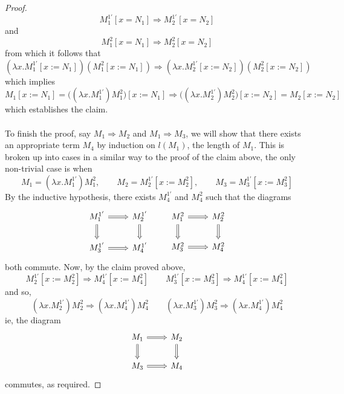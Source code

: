 \documentclass[12pt]{article}
\theoremstyle{plane}
\theoremstyle{definition}
\begin{document}
\begin{proof}
		\[M_1^{1'}[x = N_1] \Rightarrow M_2^{1'}[x = N_2]\]
		and
		\[M_1^2[x = N_1] \Rightarrow M_2^2[x = N_2]\]
		from which it follows that
		\[(\lambda x. M_1^{1'}[x := N_1])(M_1^2[x := N_1]) \Rightarrow (\lambda x. M_2^{1'}[x := N_2])(M_2^2[x := N_2])\]
		which implies
		\[M_1[x := N_1] = \big((\lambda x. M_1^{1'})M_1^2\big)[x := N_1] \Rightarrow \big((\lambda x. M_2^{1'})M_2^2\big)[x := N_2] = M_2[x := N_2]\]
		which establishes the claim.\\\\
		To finish the proof, say $M_1 \Rightarrow M_2$ and $M_1 \Rightarrow M_3$, we will show that there exists an appropriate term $M_4$ by induction on $l(M_1)$, the length of $M_1$. This is broken up into cases in a similar way to the proof of the claim above, the only non-trivial case is when
		\[M_1 = (\lambda x. M_1^{1'})M_1^2,\qquad M_2 = M_2^{1'}[x := M_2^2],\qquad M_3 = M_3^{1'}[x := M_3^2]\]
		By the inductive hypothesis, there exists $M_4^{1'}$ and $M_4^2$ such that the diagrams
		\[
		\begin{tikzcd}
			M_1^{1'}\arrow[r,Rightarrow]\arrow[d,Rightarrow] & M_2^{1'}\arrow[d,Rightarrow]\\
			M_3^{1'}\arrow[r,Rightarrow] & M_4^{1'}
		\end{tikzcd}
		\qquad
		\begin{tikzcd}
			M_1^{2}\arrow[r,Rightarrow]\arrow[d,Rightarrow] & M_2^{2}\arrow[d,Rightarrow]\\
			M_3^{2}\arrow[r,Rightarrow] & M_4^{2}
		\end{tikzcd}
		\]
		both commute. Now, by the claim proved above,
		\[M_2^{1'}[x := M_2^2] \Rightarrow M_4^{1'}[x := M_4^2]\qquad M_3^{1'}[x := M_3^2] \Rightarrow M_4^{1'}[x := M_4^2]\]
		and so,
		\[(\lambda x. M_2^{1'})M_2^2 \Rightarrow (\lambda x. M_4^{1'})M_4^2\qquad (\lambda x. M_3^{1'})M_3^2\Rightarrow (\lambda x. M_4^{1'})M_4^2\]
		ie, the diagram
		\[
		\begin{tikzcd}
			M_1\arrow[r,Rightarrow]\arrow[d,Rightarrow] &M_2\arrow[d,Rightarrow]\\
			M_3\arrow[r,Rightarrow] & M_4
		\end{tikzcd}
		\]
		commutes, as required.
	\end{proof}
	
\end{document}
